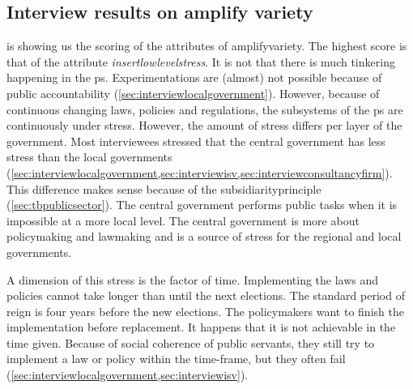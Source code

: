 \subsection{Interview results on amplify variety}
\label{sub:interviewresultsamplify}
 is showing us the scoring of the \glspl{attribute} of \gls{amplifyvariety}. The highest score is that of the \gls{attribute} \textit{\gls{insertlowlevelstress}}. It is not that there is much tinkering happening in the \gls{ps}. Experimentations are (almost) not possible because of public accountability (\cref{sec:interviewlocalgovernment}). However, because of continuous changing laws, policies and regulations, the subsystems of the \gls{ps} are continuously under stress. However, the amount of stress differs per layer of the government. Most interviewees stressed that the central government has less stress than the local governments (\cref{sec:interviewlocalgovernment,sec:interviewisv,sec:interviewconsultancyfirm}). This difference makes sense because of the \gls{subsidiarityprinciple} (\cref{sec:tbpublicsector}). The central government performs public tasks when it is impossible at a more local level. The central government is more about policymaking and lawmaking and is a source of stress for the regional and local governments. 

A dimension of this stress is the factor of time. Implementing the laws and policies cannot take longer than until the next elections. The standard period of reign is four years before the new elections. The policymakers want to finish the implementation before replacement. It happens that it is not achievable in the time given. Because of social coherence of public servants, they still try to implement a law or policy within the time-frame, but they often fail (\cref{sec:interviewlocalgovernment,sec:interviewisv}).

